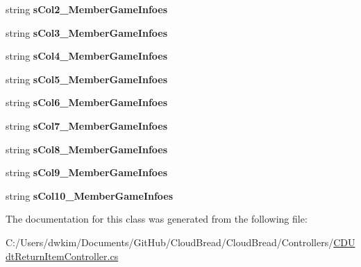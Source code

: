 \begin{DoxyCompactItemize}
\item 
string {\bfseries s\+Col2\+\_\+\+Member\+Game\+Infoes}\hypertarget{a00118_a540426b669d08d783478c7bd4409fd4d}{}\label{a00118_a540426b669d08d783478c7bd4409fd4d}

\item 
string {\bfseries s\+Col3\+\_\+\+Member\+Game\+Infoes}\hypertarget{a00118_ad6862adb8ebadb0bf9fdfcfc9e99679e}{}\label{a00118_ad6862adb8ebadb0bf9fdfcfc9e99679e}

\item 
string {\bfseries s\+Col4\+\_\+\+Member\+Game\+Infoes}\hypertarget{a00118_a9b0871be5e3a90a105253368da9b2c12}{}\label{a00118_a9b0871be5e3a90a105253368da9b2c12}

\item 
string {\bfseries s\+Col5\+\_\+\+Member\+Game\+Infoes}\hypertarget{a00118_a34c99d7142cabc7afd2ec67281338edc}{}\label{a00118_a34c99d7142cabc7afd2ec67281338edc}

\item 
string {\bfseries s\+Col6\+\_\+\+Member\+Game\+Infoes}\hypertarget{a00118_a93128ca119e519792932592d7d3ea773}{}\label{a00118_a93128ca119e519792932592d7d3ea773}

\item 
string {\bfseries s\+Col7\+\_\+\+Member\+Game\+Infoes}\hypertarget{a00118_a795fb9c099954d61bca369ae41775ccd}{}\label{a00118_a795fb9c099954d61bca369ae41775ccd}

\item 
string {\bfseries s\+Col8\+\_\+\+Member\+Game\+Infoes}\hypertarget{a00118_ad7dfc39fc78b0c1075f4a3b83ac1c436}{}\label{a00118_ad7dfc39fc78b0c1075f4a3b83ac1c436}

\item 
string {\bfseries s\+Col9\+\_\+\+Member\+Game\+Infoes}\hypertarget{a00118_a121947be0e13cf5003e6fca3cdbc2d31}{}\label{a00118_a121947be0e13cf5003e6fca3cdbc2d31}

\item 
string {\bfseries s\+Col10\+\_\+\+Member\+Game\+Infoes}\hypertarget{a00118_a91997d73f9030008791bdaadc483d556}{}\label{a00118_a91997d73f9030008791bdaadc483d556}

\end{DoxyCompactItemize}


The documentation for this class was generated from the following file\+:\begin{DoxyCompactItemize}
\item 
C\+:/\+Users/dwkim/\+Documents/\+Git\+Hub/\+Cloud\+Bread/\+Cloud\+Bread/\+Controllers/\hyperlink{a00234}{C\+D\+Udt\+Return\+Item\+Controller.\+cs}\end{DoxyCompactItemize}
